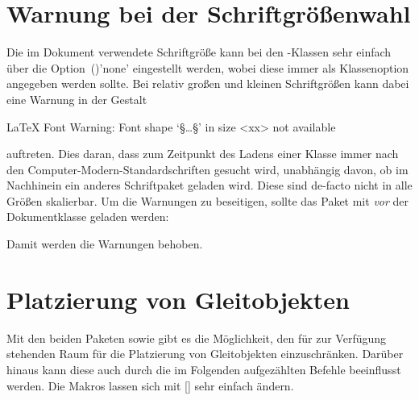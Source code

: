 \section{Warnung bei der Schriftgrößenwahl}
%
%
Die im Dokument verwendete Schriftgröße kann bei den \KOMAScript-Klassen sehr 
einfach über die Option~()'none' 
eingestellt werden, wobei diese immer als Klassenoption angegeben werden 
sollte. Bei relativ großen und kleinen Schriftgrößen kann dabei eine Warnung in 
der Gestalt 
%
\begin{quoting}
\begin{Code}[escapechar=§]
LaTeX Font Warning: Font shape `§\dots§' in size <xx> not available
\end{Code}
\end{quoting}
%
auftreten. Dies daran, dass zum Zeitpunkt des Ladens einer Klasse immer nach 
den Computer-Modern-Standardschriften gesucht wird, unabhängig davon, ob im 
Nachhinein ein anderes Schriftpaket geladen wird. Diese sind de-facto nicht in 
alle Größen skalierbar. Um die Warnungen zu beseitigen, sollte das Paket 
 mit  \emph{vor} der Dokumentklasse 
geladen werden:
% 
\begin{quoting}[rightmargin=0pt]
\end{quoting}
%
Damit werden die Warnungen behoben.


\section{Platzierung von Gleitobjekten}
%
%
%
Mit den beiden Paketen  sowie  gibt es die 
Möglichkeit, den für  zur Verfügung stehenden Raum für die 
Platzierung von Gleitobjekten einzuschränken. Darüber hinaus kann diese auch 
durch die im Folgenden aufgezählten Befehle beeinflusst werden. Die Makros 
lassen sich mit [] 
sehr einfach ändern.


